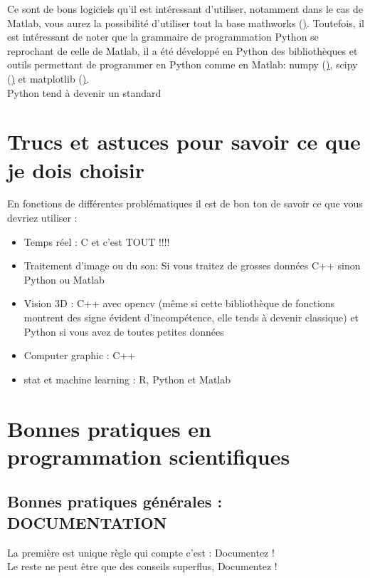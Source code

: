 Ce sont de bons logiciels qu'il est intéressant d'utiliser, notamment dans le cas de Matlab, 
vous aurez la possibilité d'utiliser tout la base mathworks 
(\href{http://www.mathworks.fr/matlabcentral/fileexchange}). Toutefois, il est intéressant 
de noter que la grammaire de programmation Python se reprochant de celle de Matlab, il a 
été développé en Python des bibliothèques et outils permettant de programmer en Python comme en Matlab: 
numpy (\href{http://www.numpy.org/}), scipy (\href{http://www.scipy.org/}) et matplotlib (\href{http://matplotlib.org/}).\\

Python tend à devenir un standard 


\section{Trucs et astuces pour savoir ce que je dois choisir}

En fonctions de différentes problématiques il est de bon ton de savoir ce que vous devriez utiliser :

\begin{itemize}
\item Temps réel : C et c'est TOUT !!!!
\item Traitement d'image ou du son: Si vous traitez de grosses données C++ sinon Python ou Matlab
\item Vision 3D : C++ avec opencv (même si cette bibliothèque de fonctions montrent des signe 
évident d'incompétence, elle tends à devenir classique) et Python si vous avez de toutes petites données
\item Computer graphic : C++ 
\item stat et machine learning : R, Python et Matlab
\end{itemize}  

\section{Bonnes pratiques en programmation scientifiques}

\subsection{Bonnes pratiques générales : DOCUMENTATION}

La première est unique règle qui compte c'est : Documentez ! \\

Le reste ne peut être que des conseils superflus, Documentez ! \\

